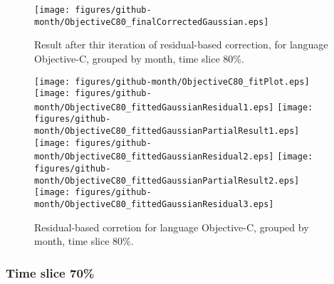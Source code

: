 \begin{figure}[]
\centering
{\texttt{[image: figures/github-month/ObjectiveC80\_finalCorrectedGaussian.eps]}}
\caption{Result after thir iteration of residual-based correction, for language Objective-C, grouped by month, time slice 80\%.}
\end{figure}


\begin{figure}[hb]
\centering
{}
{\texttt{[image: figures/github-month/ObjectiveC80\_fitPlot.eps]}}
{\texttt{[image: figures/github-month/ObjectiveC80\_fittedGaussianResidual1.eps]}}
{\texttt{[image: figures/github-month/ObjectiveC80\_fittedGaussianPartialResult1.eps]}}
{\texttt{[image: figures/github-month/ObjectiveC80\_fittedGaussianResidual2.eps]}}
{\texttt{[image: figures/github-month/ObjectiveC80\_fittedGaussianPartialResult2.eps]}}
{\texttt{[image: figures/github-month/ObjectiveC80\_fittedGaussianResidual3.eps]}}
\caption{Residual-based corretion for language Objective-C, grouped by month, time slice 80\%.}
\end{figure}


\clearpage 
\newpage 


\FloatBarrier

\subsubsection{Time slice 70\%}

